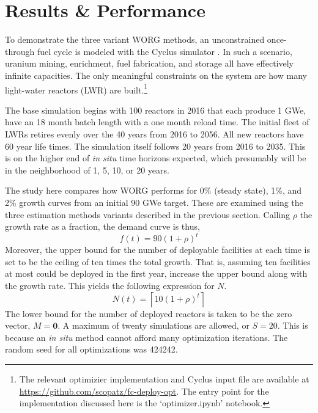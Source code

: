 \section{Results \& Performance}
\label{results}

To demonstrate the three variant WORG methods, an unconstrained
once-through fuel cycle is modeled with the Cyclus simulator
\cite{DBLP:journals/corr/HuffGCFMOSSW15}. In such a scenario, uranium
mining, enrichment, fuel fabrication, and storage all have effectively
infinite capacities. The only meaningful constraints on the system are
how many light-water reactors (LWR) are built.\footnote{The relevant
optimizier implementation and Cyclus input file are available at
\url{https://github.com/scopatz/fc-deploy-opt}. The entry point for
the implementation discussed here is the `optimizer.ipynb' notebook.}

The base simulation begins with 100 reactors in 2016 that each produce
1 GWe, have an 18 month batch length with a one month reload time.
The initial fleet of LWRs retires evenly over the 40 years from 2016 to
2056. All new reactors have 60 year life times.  The simulation itself
follows 20 years from 2016 to 2035. This is on the higher end of
\emph{in situ} time horizons expected, which presumably
will be in the neighborhood of 1, 5, 10, or 20 years.

The study here compares how WORG performs for 0\% (steady state), 1\%,
and 2\% growth curves from an initial 90 GWe target. These are examined
using the three estimation methods variants described in the previous section.
Calling $\rho$ the growth rate as a
fraction, the demand curve is thus,
\begin{equation}
\label{f-rate}
f(t) = 90 (1 + \rho)^t
\end{equation}
Moreover, the upper bound for the number of deployable facilities at
each time is set to be the ceiling of ten times the total growth.
That is, assuming ten facilities at most could be deployed in the first
year, increase the upper bound along with the growth rate.  This yields
the following expression for $N$.
\begin{equation}
\label{n-rate}
N(t) = \left\lceil 10 (1 + \rho)^t\right\rceil
\end{equation}
The lower bound for the number of deployed reactors is taken to be the
zero vector, $M = \mathbf{0}$.  A maximum of twenty simulations are allowed,
or $S = 20$.
This is because an \emph{in situ} method cannot afford many optimization
iterations. The random seed for all optimizations was 424242.

